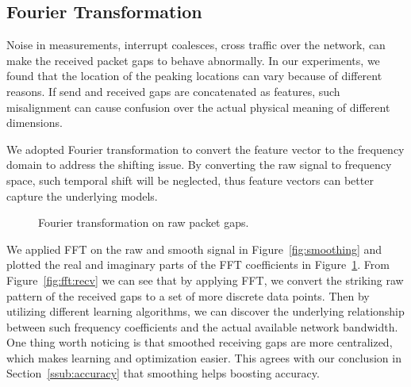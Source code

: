 \subsection{Fourier Transformation}
\label{sub:fourier_transformation}

Noise in measurements, interrupt coalesces, cross traffic over the network, can
make the received packet gaps to behave abnormally. In our experiments, we
found that the location of the peaking locations can vary because of different
reasons. If send and received gaps are concatenated as features, such
misalignment can cause confusion over the actual physical meaning of different
dimensions.

We adopted Fourier transformation to convert the feature vector to the
frequency domain to address the shifting issue. By converting the raw signal to
frequency space, such temporal shift will be neglected, thus feature vectors
can better capture the underlying models.

\begin{figure}[htpb]
   \centering
   \quad
   \caption{Fourier transformation on raw packet gaps.}
   \label{fig:fft}
\end{figure}

We applied FFT on the raw and smooth signal in Figure~\ref{fig:smoothing} and
plotted the real and imaginary parts of the FFT coefficients in
Figure~\ref{fig:fft}. From Figure~\ref{fig:fft:recv} we can see that by
applying FFT, we convert the striking raw pattern of the received gaps to a set
of more discrete data points. Then by utilizing different learning algorithms,
we can discover the underlying relationship between such frequency coefficients
and the actual available network bandwidth. One thing worth noticing is that
smoothed receiving gaps are more centralized, which makes learning and
optimization easier. This agrees with our conclusion in
Section~\ref{ssub:accuracy} that smoothing helps boosting accuracy.

